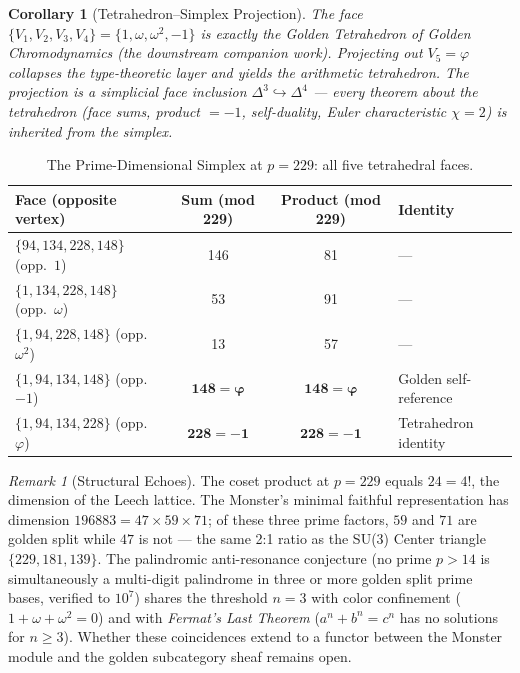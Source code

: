 \documentclass[12pt,oneside]{article}
\theoremstyle{principia}
\newtheorem{corollary}[theorem]{Corollary}
\theoremstyle{definition}
\theoremstyle{remark}
\newtheorem{remark}[theorem]{Remark}
\providecommand{\vp}{\varphi}
\begin{document}
\begin{corollary}[Tetrahedron--Simplex Projection]\label{cor:projection}
The face $\{V_1, V_2, V_3, V_4\} = \{1, \omega, \omega^2, -1\}$ is exactly the Golden Tetrahedron of Golden Chromodynamics (the downstream companion work). Projecting out $V_5 = \vp$ collapses the type-theoretic layer and yields the arithmetic tetrahedron. The projection is a simplicial face inclusion $\Delta^3 \hookrightarrow \Delta^4$ --- every theorem about the tetrahedron (face sums, product $= -1$, self-duality, Euler characteristic $\chi = 2$) is inherited from the simplex.
\end{corollary}

\begin{table}[!ht]
\centering\small
\caption{The Prime-Dimensional Simplex at $p = 229$: all five tetrahedral faces.}
\begin{tabular}{@{}lccl@{}}
\toprule
\textbf{Face (opposite vertex)} & \textbf{Sum (mod 229)} & \textbf{Product (mod 229)} & \textbf{Identity} \\
\midrule
$\{94, 134, 228, 148\}$ (opp.\ $1$) & 146 & 81 & --- \\
$\{1, 134, 228, 148\}$ (opp.\ $\omega$) & 53 & 91 & --- \\
$\{1, 94, 228, 148\}$ (opp.\ $\omega^2$) & 13 & 57 & --- \\
$\{1, 94, 134, 148\}$ (opp.\ $-1$) & $\mathbf{148 = \vp}$ & $\mathbf{148 = \vp}$ & Golden self-reference \\
$\{1, 94, 134, 228\}$ (opp.\ $\vp$) & $\mathbf{228 = -1}$ & $\mathbf{228 = -1}$ & Tetrahedron identity \\
\bottomrule
\end{tabular}
\end{table}

\begin{remark}[Structural Echoes]\label{rem:24-nexus}
The coset product at $p = 229$ equals $24 = 4!$, the dimension of the Leech lattice. The Monster's minimal faithful representation has dimension $196883 = 47 \times 59 \times 71$; of these three prime factors, $59$ and $71$ are golden split while $47$ is not --- the same 2:1 ratio as the SU(3) Center triangle $\{229, 181, 139\}$. The palindromic anti-resonance conjecture\label{conj:antires} (no prime $p > 14$ is simultaneously a multi-digit palindrome in three or more golden split prime bases, verified to $10^7$) shares the threshold $n = 3$ with color confinement ($1 + \omega + \omega^2 = 0$) and with \emph{Fermat's Last Theorem} ($a^n + b^n = c^n$ has no solutions for $n \geq 3$). Whether these coincidences extend to a functor between the Monster module and the golden subcategory sheaf remains open.
\end{remark}
\end{document}
